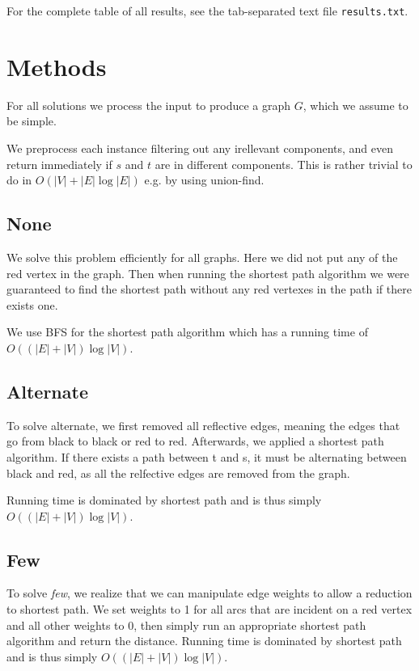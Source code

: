 \documentclass{tufte-handout}
\begin{document}
For the complete table of all results, see the tab-separated text file {\tt results.txt}.

\section{Methods}

For all solutions we process the input to produce a graph $G$,
which we assume to be simple.

We preprocess each instance filtering out any irellevant components,
and even return immediately if $s$ and $t$ are in different components.
This is rather trivial to do in $O(|V|+|E| \log |E|)$ e.g. by using union-find.

\subsection{None}
We solve this problem efficiently for all graphs.
Here we did not put any of the red vertex in the graph.
Then when running the shortest path algorithm we were guaranteed
to find the shortest path without any red vertexes in the path
if there exists one.

We use BFS for the shortest path algorithm which has a 
running time of $O((|E| + |V|) \log |V|)$.

\subsection{Alternate}
To solve alternate, we first removed all reflective edges, 
meaning the edges that go from black to black or red to red.
Afterwards, we applied a shortest path algorithm.
If there exists a path between t and s, it must be 
alternating between black and red, as all the relfective edges are removed from the graph.

Running time is dominated by shortest path and is thus simply
$O((|E|+|V|) \log |V|)$.

\subsection{Few}
To solve \textit{few}, 
we realize that we can manipulate edge weights
to allow a reduction to shortest path.
We set weights to 1 for all arcs that 
are incident on a red vertex and all other weights to 0,
then simply run an appropriate shortest path algorithm 
and return the distance.
Running time is dominated by shortest path and is thus simply
$O((|E|+|V|) \log |V|)$.
\end{document}
